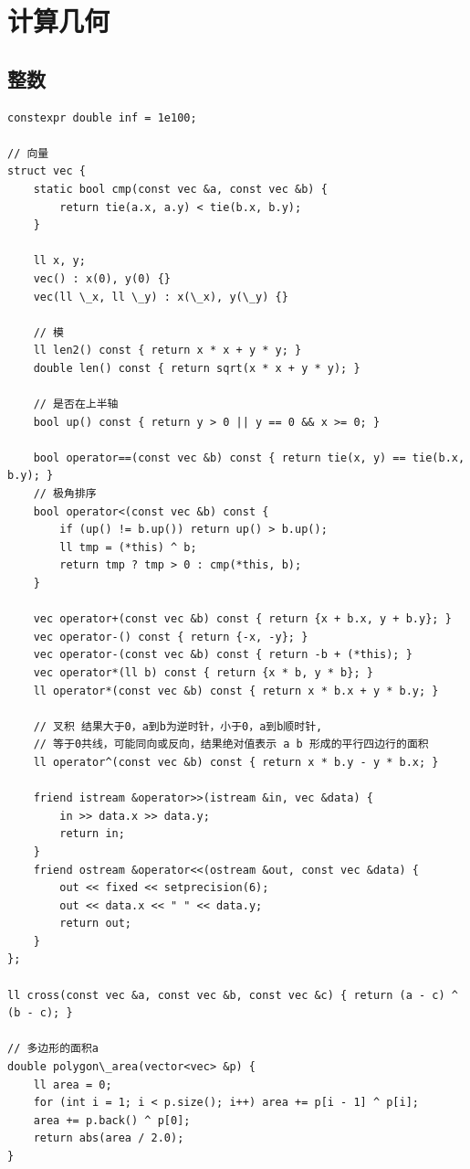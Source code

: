 \documentclass[UTF8]{ctexart}
\begin{document}
\begin{sloppypar}
\clearpage

\section{计算几何}

\subsection{整数}

\begin{lstlisting}[style=cpp]
constexpr double inf = 1e100;

// 向量
struct vec {
    static bool cmp(const vec &a, const vec &b) {
        return tie(a.x, a.y) < tie(b.x, b.y);
    }

    ll x, y;
    vec() : x(0), y(0) {}
    vec(ll \_x, ll \_y) : x(\_x), y(\_y) {}

    // 模
    ll len2() const { return x * x + y * y; }
    double len() const { return sqrt(x * x + y * y); }

    // 是否在上半轴
    bool up() const { return y > 0 || y == 0 && x >= 0; }

    bool operator==(const vec &b) const { return tie(x, y) == tie(b.x, b.y); }
    // 极角排序
    bool operator<(const vec &b) const {
        if (up() != b.up()) return up() > b.up();
        ll tmp = (*this) ^ b;
        return tmp ? tmp > 0 : cmp(*this, b);
    }

    vec operator+(const vec &b) const { return {x + b.x, y + b.y}; }
    vec operator-() const { return {-x, -y}; }
    vec operator-(const vec &b) const { return -b + (*this); }
    vec operator*(ll b) const { return {x * b, y * b}; }
    ll operator*(const vec &b) const { return x * b.x + y * b.y; }

    // 叉积 结果大于0，a到b为逆时针，小于0，a到b顺时针,
    // 等于0共线，可能同向或反向，结果绝对值表示 a b 形成的平行四边行的面积
    ll operator^(const vec &b) const { return x * b.y - y * b.x; }

    friend istream &operator>>(istream &in, vec &data) {
        in >> data.x >> data.y;
        return in;
    }
    friend ostream &operator<<(ostream &out, const vec &data) {
        out << fixed << setprecision(6);
        out << data.x << " " << data.y;
        return out;
    }
};

ll cross(const vec &a, const vec &b, const vec &c) { return (a - c) ^ (b - c); }

// 多边形的面积a
double polygon\_area(vector<vec> &p) {
    ll area = 0;
    for (int i = 1; i < p.size(); i++) area += p[i - 1] ^ p[i];
    area += p.back() ^ p[0];
    return abs(area / 2.0);
}


\end{lstlisting}
\end{sloppypar}
\end{document}
